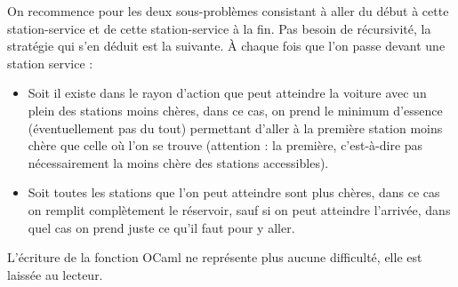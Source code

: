 On recommence pour les deux sous-problèmes consistant à aller du début à cette station-service et de cette station-service à la fin. Pas besoin de récursivité, la stratégie qui s'en déduit est la suivante. À chaque fois que l'on passe devant une station service :
\begin{itemize}
    \item Soit il existe dans le rayon d'action que peut atteindre la voiture avec un plein des stations moins chères, dans ce cas, on prend le minimum d'essence (éventuellement pas du tout) permettant d'aller à la première station moins chère que celle où l'on se trouve (attention : la première, c'est-à-dire pas nécessairement la moins chère des stations accessibles).
    \item Soit toutes les stations que l'on peut atteindre sont plus chères, dans ce cas on remplit complètement le réservoir, sauf si on peut atteindre l'arrivée, dans quel cas on prend juste ce qu'il faut pour y aller.
\end{itemize}

L'écriture de la fonction OCaml ne représente plus aucune difficulté, elle est laissée au lecteur.
\bigskip

\Fin
